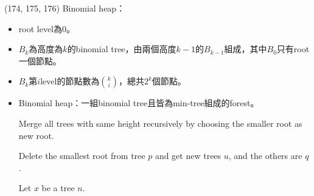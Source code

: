 \item \begin{theorem}{(174, 175, 176)} Binomial heap： \label{binomialheap}\begin{itemize}
        \item root level為$0$。
        \item $B_k$為高度為$k$的binomial tree，由兩個高度$k - 1$的$B_{k - 1}$組成，其中$B_0$只有root一個節點。
        \item $B_k$第$i$level的節點數為$\binom{k}{i}$，總共$2^k$個節點。
        \item Binomial heap：一組binomial tree且皆為min-tree組成的forest。
        \begin{algorithm}[H]
            \begin{algorithmic}[1]
                    \State Merge all trees with same height recursively by choosing the smaller root as new root.
                \EndFunction
            \end{algorithmic}
        \end{algorithm}
        \begin{algorithm}[H]
            \begin{algorithmic}[1]
                    \State Delete the smallest root from tree $p$ and get new trees $u$, and the others are $q$.
                    \State {}
                \EndFunction
            \end{algorithmic}
        \end{algorithm}
        \begin{algorithm}[H]
            \begin{algorithmic}[1]
                    \State Let $x$ be a tree $n$.
                    \State {}
                \EndFunction
            \end{algorithmic}
        \end{algorithm}
    \end{itemize}
\end{theorem}

